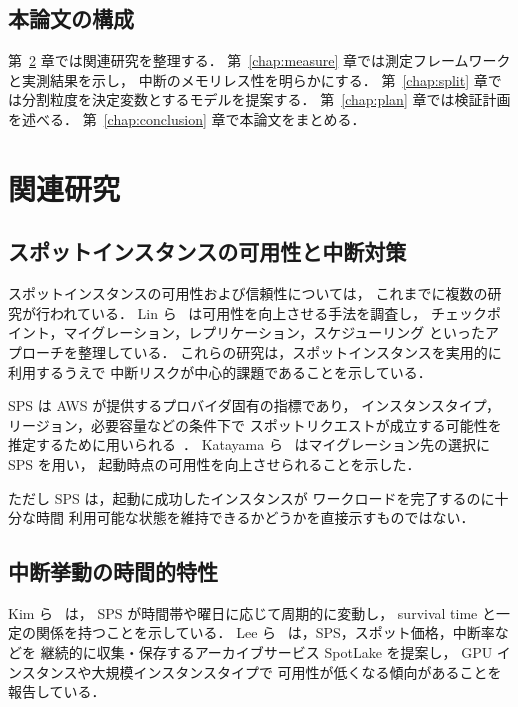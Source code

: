 \documentclass[11pt,a4paper]{ltjsreport}
\begin{document}
\section{本論文の構成}

第~\ref{chap:related} 章では関連研究を整理する．
第~\ref{chap:measure} 章では測定フレームワークと実測結果を示し，
中断のメモリレス性を明らかにする．
第~\ref{chap:split} 章では分割粒度を決定変数とするモデルを提案する．
第~\ref{chap:plan} 章では検証計画を述べる．
第~\ref{chap:conclusion} 章で本論文をまとめる．

\chapter{関連研究}
\label{chap:related}

\section{スポットインスタンスの可用性と中断対策}

スポットインスタンスの可用性および信頼性については，
これまでに複数の研究が行われている．
Lin ら~\cite{Lin2022Survey} は可用性を向上させる手法を調査し，
チェックポイント，マイグレーション，レプリケーション，スケジューリング
といったアプローチを整理している．
これらの研究は，スポットインスタンスを実用的に利用するうえで
中断リスクが中心的課題であることを示している．

SPS は AWS が提供するプロバイダ固有の指標であり，
インスタンスタイプ，リージョン，必要容量などの条件下で
スポットリクエストが成立する可能性を推定するために用いられる~\cite{AWSSPS}．
Katayama ら~\cite{Katayama2022} はマイグレーション先の選択に SPS を用い，
起動時点の可用性を向上させられることを示した．

ただし SPS は，起動に成功したインスタンスが
ワークロードを完了するのに十分な時間
利用可能な状態を維持できるかどうかを直接示すものではない．

\section{中断挙動の時間的特性}

Kim ら~\cite{Kim2024SpotInterruption} は，
SPS が時間帯や曜日に応じて周期的に変動し，
survival time と一定の関係を持つことを示している．
Lee ら~\cite{Lee2022SpotLake} は，SPS，スポット価格，中断率などを
継続的に収集・保存するアーカイブサービス SpotLake を提案し，
GPU インスタンスや大規模インスタンスタイプで
可用性が低くなる傾向があることを報告している．
\end{document}
